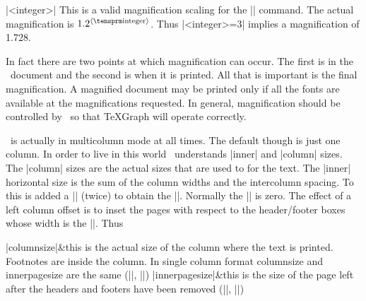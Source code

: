 \mbr
\pri\@|\magstep<integer>|
\nbr
This is a valid magnification scaling for the |\magnification| command. The
actual magnification is $1.2^{\langle{\rm integer}\rangle}$. 
Thus |<integer>=3| implies a
magnification of 1.728.
\endblockmode

In fact there are two points at which
magnification can occur. The first is in the \tex\ document and the second is
when it is printed. All that is important is the final magnification. A
magnified document may be printed only if all the fonts are available at the
magnifications requested. In general, magnification should be controlled by 
\intex\ so that \TeX Graph will operate correctly. 

\intex\ is actually in multicolumn mode at all times. The default though is
just one column. In order to live in this world \intex\ understands |inner|
and |column| sizes. The |column| sizes are the actual sizes that are used to
for the text. The |inner| horizontal size is the sum of the column widths and
the intercolumn spacing. To this is added a \@|\leftcolumnoffset| (twice) to
obtain the |\houterpagesize|. Normally the |\leftcolumnoffset| is zero. The
effect of a left column offset is to inset the pages with respect to the
header/footer boxes whose width is the |\houterpagesize|. Thus 

\bshortcomlist
|columnsize|&this is the actual size of the column
                                    where the text is printed. Footnotes 
                                    are inside the column. In single 
                                    column format columnsize and innerpagesize
                                    are the same 
                                    (\@|\vcolumnsize|, \@|\hcolumnsize|) \cr
|innerpagesize|&this is the size of the page left after
                 the headers and footers have been removed 
                 (\@|\vinnerpagesize|, \@|\hinnerpagesize|) \cr
\eshortcomlist
\ejectpage
\done
